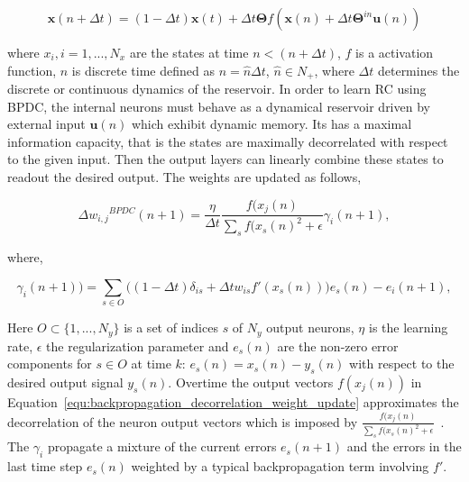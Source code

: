 \documentclass{WitsPhysicsReport}
\begin{document}
\begin{equation}
\mathbf{x}(n + \Delta t) = (1-\Delta t)\mathbf{x}(t) + \Delta t \mathbf{\Theta} f(\mathbf{x}(n) + \Delta t \mathbf{\Theta}^{in} \mathbf{u}(n))
\label{equ:backpropagation_decorrelation}
\end{equation}


where $x_{i}, i=1,...,N_{x}$ are the states at time $n<(n+\Delta t)$, $f$ is a activation function, $n$ is discrete time defined as $n= \hat n \Delta t$, $\hat n \in N_{+}$, where $\Delta t$ determines the discrete or continuous dynamics of the reservoir. In order to learn RC using BPDC, the internal neurons must behave as a dynamical reservoir driven by external input $ \mathbf{u}(n)$ which exhibit dynamic memory. Its has a maximal information capacity, that is the states are maximally decorrelated with respect to the given input. Then the output layers can linearly combine these states to readout the desired output.  The weights are updated as follows,



\begin{equation}
\Delta {w_{i,j}}^{BPDC} (n+1) = \frac{\eta}{\Delta t} \frac{f(x_{j}(n)}{\sum_{s} f(x_{s}(n)^{2} + \epsilon} \gamma_{i}(n+1),
\label{equ:backpropagation_decorrelation_weight_update}
\end{equation}

where,

\begin{equation}
\gamma_{i}(n+1)) = \sum_{s \in O} \Big( (1-\Delta t)\delta_{is} + \Delta t w_{is} f'(x_{s}(n)) \Big) e_{s}(n) - e_{i}(n+1),
\label{equ:backpropagation_decorrelation_weight_update_gamma}
\end{equation}



Here $O\subset \{1,...,N_{y}\}$ is a set of indices  $s$  of $N_{y}$ output neurons, $\eta$ is the learning rate, $\epsilon$ the regularization parameter and $e_{s}(n)$ are the non-zero error components for $s\in O$ at time $k$: $e_{s}(n)= x_{s}(n) - y_{s}(n)$ with respect to the desired output signal $y_{s}(n)$. Overtime the output vectors $f(x_{j}(n))$  in Equation~\ref{equ:backpropagation_decorrelation_weight_update} approximates the decorrelation of the neuron output vectors which is imposed by  $\frac{f(x_{j}(n)}{\sum_{s} f(x_{s}(n)^{2} + \epsilon}$~\cite{steil2005memory}. The $\gamma_{i}$ propagate a mixture of the current errors  $e_{s}(n+1)$ and the errors in the last time step  $e_{s}(n)$ weighted by a typical backpropagation term involving $f'$. 
\end{document}
